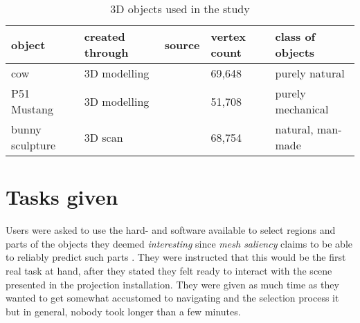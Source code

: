 \begin{table}[]
\centering
	\begin{tabular}{l|l|l|l|l}
		object	& created through	& source	& vertex count	& class of objects	\\ \hline
		cow	& 3D modelling		& \cite{cow}	& 69,648	& purely natural	\\
		P51 Mustang	&	3D modelling	& \cite{P51}	& 51,708	& purely mechanical	\\
		bunny sculpture	&	3D scan	& \cite{bun}	& 68,754	& natural, man-made	
	\end{tabular}
	\caption{3D objects used in the study}
	\label{tab:userstudy_objects}
\end{table}

	\section{Tasks given}
	\label{sec:tasks_given}
%
%

Users were asked to use the hard- and software available to select regions and parts of the objects they deemed \textit{interesting} since \textit{mesh saliency} claims to be able to reliably predict such parts \cite{lee2005mesh}. They were instructed that this would be the first real task at hand, after they stated they felt ready to interact with the scene presented in the projection installation. They were given as much time as they wanted to get somewhat accustomed to navigating and the selection process it but in general, nobody took longer than a few minutes.


